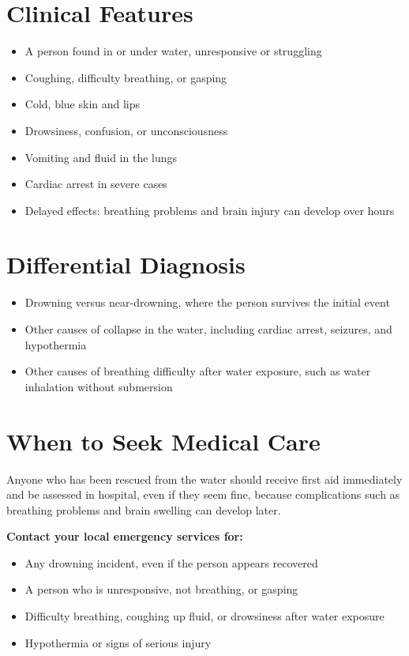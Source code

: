 \section*{Clinical Features}
\begin{itemize}
    \item A person found in or under water, unresponsive or struggling
    \item Coughing, difficulty breathing, or gasping
    \item Cold, blue skin and lips
    \item Drowsiness, confusion, or unconsciousness
    \item Vomiting and fluid in the lungs
    \item Cardiac arrest in severe cases
    \item Delayed effects: breathing problems and brain injury can develop over hours
\end{itemize}

\section*{Differential Diagnosis}
\begin{itemize}
    \item Drowning versus near-drowning, where the person survives the initial event
    \item Other causes of collapse in the water, including cardiac arrest, seizures, and hypothermia
    \item Other causes of breathing difficulty after water exposure, such as water inhalation without submersion
\end{itemize}

\section*{When to Seek Medical Care}
Anyone who has been rescued from the water should receive first aid immediately and be assessed in hospital, even if they seem fine, because complications such as breathing problems and brain swelling can develop later.

\textbf{Contact your local emergency services for:}
\begin{itemize}
    \item Any drowning incident, even if the person appears recovered
    \item A person who is unresponsive, not breathing, or gasping
    \item Difficulty breathing, coughing up fluid, or drowsiness after water exposure
    \item Hypothermia or signs of serious injury
\end{itemize}

